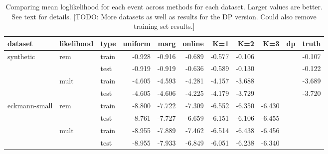 \begin{table}[t]
\begin{center}
{\footnotesize
\begin{tabular}{lllrrrrrrrr}
  \hline
dataset & likelihood & type & uniform & marg & online & K=1 & K=2 & K=3 & dp & truth \\ 
  \hline
synthetic & rem & train & -0.928 & -0.916 & -0.689 & -0.577 & -0.106 &  &  & -0.107 \\ 
   &  & test & -0.919 & -0.919 & -0.636 & -0.589 & -0.130 &  &  & -0.122 \\ 
   & mult & train & -4.605 & -4.593 & -4.281 & -4.157 & -3.688 &  &  & -3.689 \\ 
   &  & test & -4.605 & -4.606 & -4.225 & -4.179 & -3.729 &  &  & -3.720 \\ 
  eckmann-small & rem & train & -8.800 & -7.722 & -7.309 & -6.552 & -6.350 & -6.430 &  &  \\ 
   &  & test & -8.761 & -7.727 & -6.659 & -6.151 & -6.106 & -6.455 &  &  \\ 
   & mult & train & -8.955 & -7.889 & -7.462 & -6.514 & -6.438 & -6.456 &  &  \\ 
   &  & test & -8.955 & -7.933 & -6.849 & -6.051 & -6.238 & -6.340 &  &  \\ 
   \hline
\end{tabular}
}
\caption{Comparing mean loglikelihood for each event across methods for each dataset.  Larger values are better.  See text for details. [TODO: More datasets as well as results for the DP version.  Could also remove training set results.]}
\label{tab:results}
\end{center}
\end{table}
